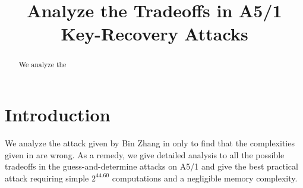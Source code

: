 

        
\mainmatter
\title{Analyze the Tradeoffs in A5/1 Key-Recovery Attacks}
\maketitle


%




\begin{abstract}
We analyze the
\end{abstract}

\section{Introduction}
We analyze the attack given by Bin Zhang in \cite{AC:Zhang19} only to find that the complexities given in \cite{AC:Zhang19} are wrong.
As a remedy, we give detailed analysis to all the possible tradeoffs in the guess-and-determine attacks on A5/1 and give the best practical attack requiring simple $2^{44.60}$ computations and a negligible memory complexity.


